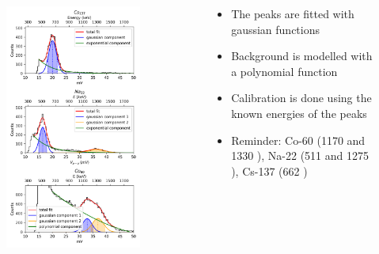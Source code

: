 \begin{frame}[plain]
    \begin{columns}
        \begin{column}{0.5\textwidth}
            \begin{figure}
                \centering
                \includegraphics[width=0.85\textwidth]{images/sipm_spectra.png}
            \end{figure}
        \end{column}
        \begin{column}{0.5\textwidth}
            \begin{itemize}
                \item The peaks are fitted with gaussian functions
                \item Background is modelled with a polynomial function
                \item Calibration is done using the known energies of the peaks
                \item Reminder: Co-60 (1170 and 1330 \keV), Na-22 (511 \keV and 1275 \keV), Cs-137 (662 \keV)
            \end{itemize}
        \end{column}
    \end{columns}
\end{frame}

